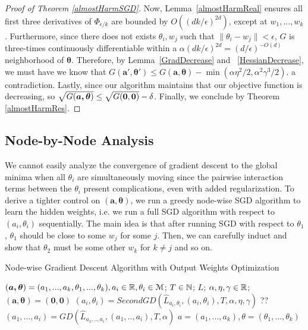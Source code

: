 \begin{proof}[Proof of Theorem \ref{almostHarmSGD}]
Now, Lemma~\ref{almostHarmReal} ensures all first three derivatives of $\Phi_{\epsilon/k}$ are bounded by $O((dk/\epsilon)^{2d})$, except at $w_1,...,w_k$. Furthermore, since there does not exists $\theta_i, w_j$ such that $\|\theta_i - w_j\| <\epsilon$, $G$ is three-times continuously differentiable within a $\alpha (dk/\epsilon)^{2d} = (d/\epsilon)^{-O(d)}$ neighborhood of $\boldsymbol{\theta}$. Therefore, by Lemma~\ref{GradDecrease} and ~\ref{HessianDecrease}, we must have  we know that $G(\boldsymbol{a',\theta'}) \leq G(\boldsymbol{a,\theta}) - \min(\alpha\eta^2/2,\alpha^2\gamma^3/2)$. a contradiction. Lastly, since our algorithm maintains that our objective function is decreasing, so $\sqrt{G(\boldsymbol{a,\theta})} \leq \sqrt{G({\bf 0,0})} - \delta$. Finally, we conclude by Theorem \ref{almostHarmRes}.
\end{proof}

\subsection{Node-by-Node Analysis}
We cannot easily analyze the convergence of gradient descent to the global minima when all $\theta_i$ are simultaneously moving since the pairwise interaction terms between the $\theta_i$ present complications, even with added regularization. To derive a tighter control on $(\boldsymbol{a,\theta})$, we run a greedy
node-wise SGD  algorithm to learn the hidden weights, i.e. we run a
full SGD algorithm with respect to $(a_i,\theta_i)$ sequentially. The
main idea is that after running SGD with respect to $\theta_1$,
$\theta_1$ should be close to some $w_j$ for some $j$. Then, we can
carefully induct and show that $\theta_2$ must be some other $w_k$ for
$k\neq j$ and so on.

%
\begin{algorithm}[tb]
 \caption{Node-wise Gradient Descent Algorithm with Output Weights Optimization}
   \label{NodeGDOpt}
\begin{algorithmic}
  $(\boldsymbol{a,\theta}) = (a_1,...,a_k,\theta_1,...,\theta_k), a_i
  \in{\mathbb{R}}, \theta_i\in\mathcal{M}$;
  $T\in {\mathbb{N}}$; $L$; $\alpha, \eta, \gamma \in {\mathbb{R}}$; 
    $\boldsymbol{(a,\theta) = (0,0)}$
  \State $(a_i, \theta_i) = SecondGD \left(\widehat{L}_{a_i, \theta_i},(a_i,\theta_i),T, \alpha,\eta,\gamma \right)$
  \State ?? 
   \State    $(a_1,...,a_i) =  GD \left(\widehat{L}_{a_1,..,a_i},
     (a_1,..,a_i), T , \alpha \right)$\;
   \EndFor
    $a = (a_1,...,a_k), \theta = (\theta_1,..., \theta_k)$
   \end{algorithmic}
\end{algorithm}

